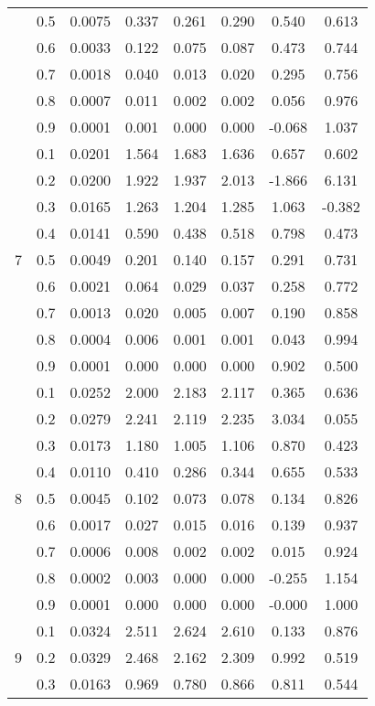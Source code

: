 \documentclass[11pt,a4paper]{report}
\begin{document}
\begin{longtable}{ | c | c || c | c | c | c | c | c | }
 & 0.5 & 0.0075 & 0.337 & 0.261 & 0.290 & 0.540 & 0.613 \\
 & 0.6 & 0.0033 & 0.122 & 0.075 & 0.087 & 0.473 & 0.744 \\
 & 0.7 & 0.0018 & 0.040 & 0.013 & 0.020 & 0.295 & 0.756 \\
 & 0.8 & 0.0007 & 0.011 & 0.002 & 0.002 & 0.056 & 0.976 \\
 & 0.9 & 0.0001 & 0.001 & 0.000 & 0.000 & -0.068 & 1.037 \\
 \hline
\multirow{9}{*}{7} & 0.1 & 0.0201 & 1.564 & 1.683 & 1.636 & 0.657 & 0.602 \\
 & 0.2 & 0.0200 & 1.922 & 1.937 & 2.013 & -1.866 & 6.131 \\
 & 0.3 & 0.0165 & 1.263 & 1.204 & 1.285 & 1.063 & -0.382 \\
 & 0.4 & 0.0141 & 0.590 & 0.438 & 0.518 & 0.798 & 0.473 \\
 & 0.5 & 0.0049 & 0.201 & 0.140 & 0.157 & 0.291 & 0.731 \\
 & 0.6 & 0.0021 & 0.064 & 0.029 & 0.037 & 0.258 & 0.772 \\
 & 0.7 & 0.0013 & 0.020 & 0.005 & 0.007 & 0.190 & 0.858 \\
 & 0.8 & 0.0004 & 0.006 & 0.001 & 0.001 & 0.043 & 0.994 \\
 & 0.9 & 0.0001 & 0.000 & 0.000 & 0.000 & 0.902 & 0.500 \\
 \hline
\multirow{9}{*}{8} & 0.1 & 0.0252 & 2.000 & 2.183 & 2.117 & 0.365 & 0.636 \\
 & 0.2 & 0.0279 & 2.241 & 2.119 & 2.235 & 3.034 & 0.055 \\
 & 0.3 & 0.0173 & 1.180 & 1.005 & 1.106 & 0.870 & 0.423 \\
 & 0.4 & 0.0110 & 0.410 & 0.286 & 0.344 & 0.655 & 0.533 \\
 & 0.5 & 0.0045 & 0.102 & 0.073 & 0.078 & 0.134 & 0.826 \\
 & 0.6 & 0.0017 & 0.027 & 0.015 & 0.016 & 0.139 & 0.937 \\
 & 0.7 & 0.0006 & 0.008 & 0.002 & 0.002 & 0.015 & 0.924 \\
 & 0.8 & 0.0002 & 0.003 & 0.000 & 0.000 & -0.255 & 1.154 \\
 & 0.9 & 0.0001 & 0.000 & 0.000 & 0.000 & -0.000 & 1.000 \\
 \hline
\multirow{9}{*}{9} & 0.1 & 0.0324 & 2.511 & 2.624 & 2.610 & 0.133 & 0.876 \\
 & 0.2 & 0.0329 & 2.468 & 2.162 & 2.309 & 0.992 & 0.519 \\
 & 0.3 & 0.0163 & 0.969 & 0.780 & 0.866 & 0.811 & 0.544 \\

\end{longtable}
\end{document}
